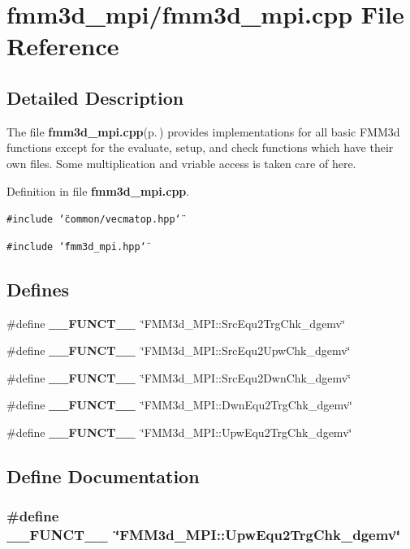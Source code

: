 \section{fmm3d\_\-mpi/fmm3d\_\-mpi.cpp File Reference}
\label{fmm3d__mpi_8cpp}


\subsection{Detailed Description}
The file {\bf fmm3d\_\-mpi.cpp}{\rm (p.\,\pageref{fmm3d__mpi_8cpp})} provides implementations for all basic FMM3d functions except for the evaluate, setup, and check functions which have their own files. Some multiplication and vriable access is taken care of here. 

Definition in file {\bf fmm3d\_\-mpi.cpp}.

{\tt \#include \char`\"{}common/vecmatop.hpp\char`\"{}}\par
{\tt \#include \char`\"{}fmm3d\_\-mpi.hpp\char`\"{}}\par
\subsection*{Defines}
\begin{CompactItemize}
\item 
\#define {\bf \_\-\_\-FUNCT\_\-\_\-}~\char`\"{}FMM3d\_\-MPI::Src\-Equ2Trg\-Chk\_\-dgemv\char`\"{}
\item 
\#define {\bf \_\-\_\-FUNCT\_\-\_\-}~\char`\"{}FMM3d\_\-MPI::Src\-Equ2Upw\-Chk\_\-dgemv\char`\"{}
\item 
\#define {\bf \_\-\_\-FUNCT\_\-\_\-}~\char`\"{}FMM3d\_\-MPI::Src\-Equ2Dwn\-Chk\_\-dgemv\char`\"{}
\item 
\#define {\bf \_\-\_\-FUNCT\_\-\_\-}~\char`\"{}FMM3d\_\-MPI::Dwn\-Equ2Trg\-Chk\_\-dgemv\char`\"{}
\item 
\#define {\bf \_\-\_\-FUNCT\_\-\_\-}~\char`\"{}FMM3d\_\-MPI::Upw\-Equ2Trg\-Chk\_\-dgemv\char`\"{}
\end{CompactItemize}


\subsection{Define Documentation}
\subsubsection{\setlength{\rightskip}{0pt plus 5cm}\#define \_\-\_\-FUNCT\_\-\_\-~\char`\"{}FMM3d\_\-MPI::Upw\-Equ2Trg\-Chk\_\-dgemv\char`\"{}}\label{fmm3d__mpi_8cpp_2818853adf63a17949cf67d73c1d4473_2818853adf63a17949cf67d73c1d4473}




